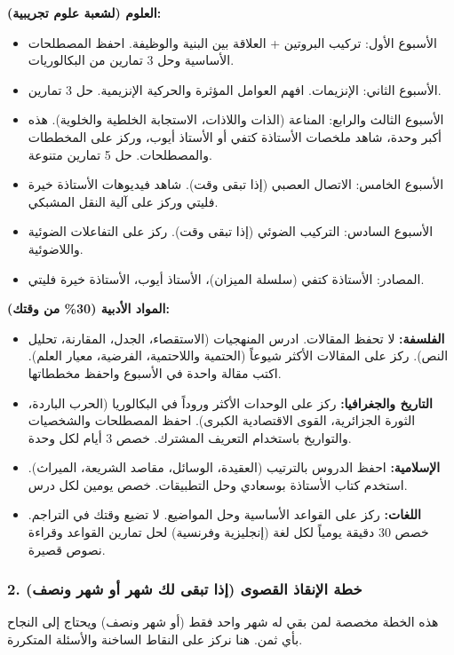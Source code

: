 \documentclass[12pt,a4paper]{book}
\begin{document}
	\textbf{العلوم (لشعبة علوم تجريبية):}
	\begin{itemize}
		\item الأسبوع الأول: تركيب البروتين + العلاقة بين البنية والوظيفة. احفظ المصطلحات الأساسية  وحل 3 تمارين من البكالوريات.
		\item الأسبوع الثاني: الإنزيمات. افهم العوامل المؤثرة والحركية الإنزيمية. حل 3 تمارين.
		\item الأسبوع الثالث والرابع: المناعة (الذات واللاذات، الاستجابة الخلطية والخلوية). هذه أكبر وحدة، شاهد ملخصات الأستاذة كتفي أو الأستاذ أيوب، وركز على المخططات والمصطلحات. حل 5 تمارين متنوعة.
		\item الأسبوع الخامس: الاتصال العصبي (إذا تبقى وقت). شاهد فيديوهات الأستاذة خيرة فليتي وركز على آلية النقل المشبكي.
		\item الأسبوع السادس: التركيب الضوئي (إذا تبقى وقت). ركز على التفاعلات الضوئية واللاضوئية.
		\item المصادر: الأستاذة كتفي (سلسلة الميزان)، الأستاذ أيوب، الأستاذة خيرة فليتي.
	\end{itemize}
	
	\textbf{المواد الأدبية (30\% من وقتك):}
	\begin{itemize}
		\item \textbf{الفلسفة:} لا تحفظ المقالات. ادرس المنهجيات (الاستقصاء، الجدل، المقارنة، تحليل النص). ركز على المقالات الأكثر شيوعاً (الحتمية واللاحتمية، الفرضية، معيار العلم). اكتب مقالة واحدة في الأسبوع واحفظ مخططاتها.
		\item \textbf{التاريخ والجغرافيا:} ركز على الوحدات الأكثر وروداً في البكالوريا (الحرب الباردة، الثورة الجزائرية، القوى الاقتصادية الكبرى). احفظ المصطلحات والشخصيات والتواريخ باستخدام التعريف المشترك. خصص 3 أيام لكل وحدة.
		\item \textbf{الإسلامية:} احفظ الدروس بالترتيب (العقيدة، الوسائل، مقاصد الشريعة، الميراث). استخدم كتاب الأستاذة بوسعادي وحل التطبيقات. خصص يومين لكل درس.
		\item \textbf{اللغات:} ركز على القواعد الأساسية وحل المواضيع. لا تضيع وقتك في التراجم. خصص 30 دقيقة يومياً لكل لغة (إنجليزية وفرنسية) لحل تمارين القواعد وقراءة نصوص قصيرة.
	\end{itemize}
	
	\subsubsection*{2. خطة الإنقاذ القصوى (إذا تبقى لك شهر أو شهر ونصف)}
	هذه الخطة مخصصة لمن بقي له شهر واحد فقط (أو شهر ونصف) ويحتاج إلى النجاح بأي ثمن. هنا نركز على النقاط الساخنة والأسئلة المتكررة.
	
\end{document}
